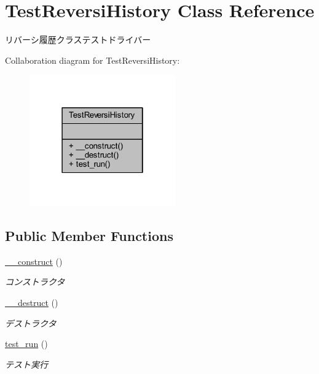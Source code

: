\hypertarget{class_test_reversi_history}{}\section{Test\+Reversi\+History Class Reference}
\label{class_test_reversi_history}


リバーシ履歴クラステストドライバー  




Collaboration diagram for Test\+Reversi\+History\+:
\nopagebreak
\begin{figure}[H]
\begin{center}
\leavevmode
\includegraphics[width=178pt]{class_test_reversi_history__coll__graph}
\end{center}
\end{figure}
\subsection*{Public Member Functions}
\begin{DoxyCompactItemize}
\item 
\hyperlink{class_test_reversi_history_a095c5d389db211932136b53f25f39685}{\+\_\+\+\_\+construct} ()
\begin{DoxyCompactList}\small\item\em コンストラクタ \end{DoxyCompactList}\item 
\hyperlink{class_test_reversi_history_a421831a265621325e1fdd19aace0c758}{\+\_\+\+\_\+destruct} ()
\begin{DoxyCompactList}\small\item\em デストラクタ \end{DoxyCompactList}\item 
\hyperlink{class_test_reversi_history_a9b029832cfdf19c0ef36b1f5ef7b7735}{test\+\_\+run} ()
\begin{DoxyCompactList}\small\item\em テスト実行 \end{DoxyCompactList}\end{DoxyCompactItemize}


